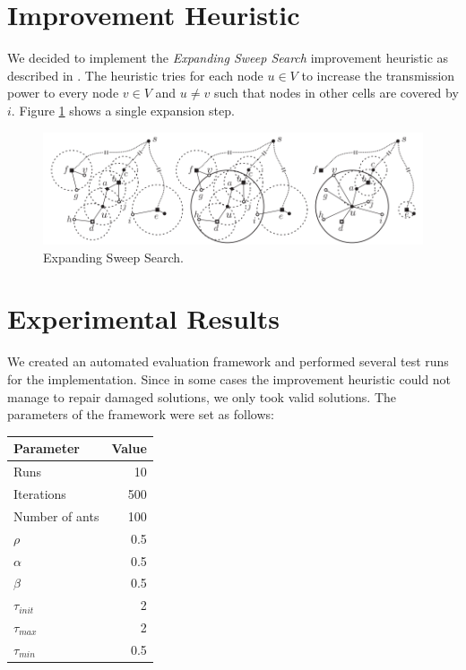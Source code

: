 \documentclass{article}
\theoremstyle{definition}
\begin{document}
\section{Improvement Heuristic}

We decided to implement the \emph{Expanding Sweep Search} improvement heuristic as described in \cite{Kang2005}. The heuristic tries for each node $u \in V$ to increase the transmission power to every node $v \in V$ and $u \neq v$ such that nodes in other cells are covered by $i$. Figure \ref{fig:sweep} shows a single expansion step.

\begin{figure}[h]
	\begin{center}
	\includegraphics[width=12cm]{images/sweepsearch.png}
	\end{center}
	\caption{Expanding Sweep Search.} \label{fig:sweep}
\end{figure}

\section{Experimental Results}

We created an automated evaluation framework and performed several test runs for the implementation. Since in some cases the improvement heuristic could not manage to repair damaged solutions, we only took valid solutions. The parameters of the framework were set as follows:

\begin{center}
\begin{tabular}{|l|r|}
	\hline
	\textbf{Parameter} & \textbf{Value} \\
	\hline
	Runs & 10 \\
	\hline
	Iterations & 500 \\
	\hline
	Number of ants & 100 \\
	\hline
	$\rho$ & 0.5 \\
	\hline
	$\alpha$ & 0.5 \\
	\hline
	$\beta$ & 0.5 \\
	\hline
	$\tau_{init}$ & 2 \\
	\hline
	$\tau_{max}$ & 2 \\
	\hline
	$\tau_{min}$ & 0.5 \\
	\hline
\end{tabular}
\end{center}
\end{document}
